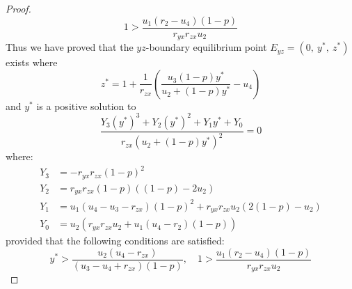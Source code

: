\begin{proof}
    \begin{equation*}
        1 > \frac{u_1\left(r_2-u_4\right)\left(1-p\right)}{r_{yx}r_{zx}u_2}
    \end{equation*}
    Thus we have proved that the $yz$-boundary equilibrium point $E_{yz}=\left(0,\ y^*,\ z^*\right)$ exists where
    \begin{equation*}
        z^*=1+\frac{1}{r_{zx}}\left(\frac{u_3\left(1-p\right)y^*}{u_2+\left(1-p\right)y^*}-u_4\right)
    \end{equation*}
    and $y^*$ is a positive solution to 
    \begin{equation*}
        \frac{Y_3\left(y^*\right)^3+Y_2\left(y^*\right)^2+Y_1y^*+Y_0}{r_{zx}\left(u_2+\left(1-p\right)y^*\right)^2}=0
    \end{equation*}
    where:
    \begin{align*}
        Y_3 &= -r_{yx}r_{zx}\left(1-p\right)^2\\
        Y_2 &= r_{yx}r_{zx}\left(1-p\right)\left(\left(1-p\right)-2u_2\right)\\
        Y_1 &= u_1\left(u_4-u_3-r_{zx}\right)\left(1-p\right)^2+r_{yx}r_{zx}u_2\left(2\left(1-p\right)-u_2\right)\\
        Y_0 &= u_2\left(r_{yx}r_{zx}u_2+u_1\left(u_4-r_2\right)\left(1-p\right)\right)
    \end{align*}
    provided that the following conditions are satisfied:
    \begin{equation*}
        y^* > \frac{u_2\left(u_4-r_{zx}\right)}{\left(u_3-u_4+r_{zx}\right)\left(1-p\right)},\quad 
        1 > \frac{u_1\left(r_2-u_4\right)\left(1-p\right)}{r_{yx}r_{zx}u_2}
    \end{equation*}
\end{proof}

